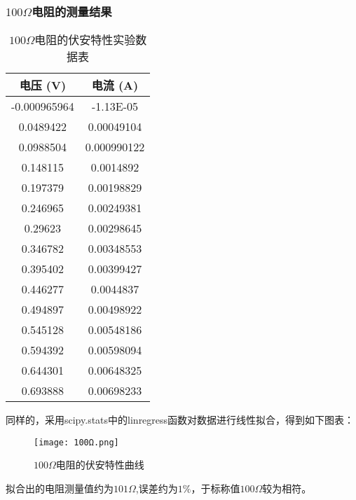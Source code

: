 \documentclass[UTF-8,twoside,cs4size]{ctexart}
\begin{document}
        \subsubsection{$ 100\Omega $电阻的测量结果}
        \begin{table}[htbp]
            \centering
            \begin{tabular}{|c|c|}
            \hline
            电压 (V)    & 电流 (A)    \\ \hline
            -0.000965964 & -1.13E-05   \\ \hline
            0.0489422   & 0.00049104   \\ \hline
            0.0988504   & 0.000990122  \\ \hline
            0.148115    & 0.0014892    \\ \hline
            0.197379    & 0.00198829   \\ \hline
            0.246965    & 0.00249381   \\ \hline
            0.29623     & 0.00298645   \\ \hline
            0.346782    & 0.00348553   \\ \hline
            0.395402    & 0.00399427   \\ \hline
            0.446277    & 0.0044837    \\ \hline
            0.494897    & 0.00498922   \\ \hline
            0.545128    & 0.00548186   \\ \hline
            0.594392    & 0.00598094   \\ \hline
            0.644301    & 0.00648325   \\ \hline
            0.693888    & 0.00698233   \\ \hline
            \end{tabular}
            \caption{$100\Omega$电阻的伏安特性实验数据表}
            \end{table}
            同样的，采用scipy.stats中的linregress函数对数据进行线性拟合，得到如下图表：
            \begin{figure}[!h]
                \centering
                \texttt{[image: 100Ω.png]}
                \caption{$100\Omega$电阻的伏安特性曲线}
            \end{figure}
            \newpage
            拟合出的电阻测量值约为$101\Omega$,误差约为$1\%$，于标称值$100\Omega$较为相符。
\end{document}
